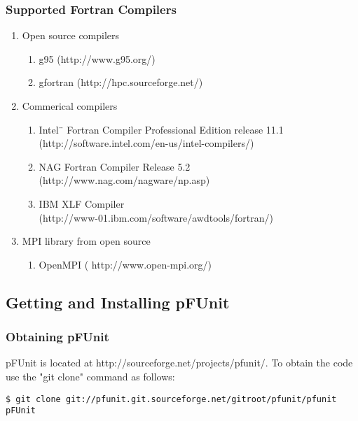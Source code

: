\documentclass[10pt]{article}
\newcommand{\pfunit}{{\sc pFUnit }}
\begin{document}
\subsubsection{Supported Fortran Compilers}

\begin{enumerate}
	\item Open source compilers
	\begin{enumerate}
		 \item g95 (http://www.g95.org/)
		 \item gfortran (http://hpc.sourceforge.net/)
	\end{enumerate}
	
	\item Commerical compilers
	\begin{enumerate}
		 \item Intel¨ Fortran Compiler Professional Edition release 11.1 \\
			(http://software.intel.com/en-us/intel-compilers/)
		 \item NAG Fortran Compiler Release 5.2 \\
			(http://www.nag.com/nagware/np.asp)
		 \item IBM XLF Compiler \\
			(http://www-01.ibm.com/software/awdtools/fortran/)
	\end{enumerate}

	\item MPI library from open source
	\begin{enumerate}
		 \item OpenMPI ( http://www.open-mpi.org/) 
	\end{enumerate}
\end{enumerate}

\subsection{Getting and Installing \pfunit}
\subsubsection{Obtaining \pfunit}

\pfunit is located at http://sourceforge.net/projects/pfunit/. To obtain the code use the "git clone" command as follows: 


\begin{verbatim}
$ git clone git://pfunit.git.sourceforge.net/gitroot/pfunit/pfunit pFUnit
\end{verbatim}
\end{document}
